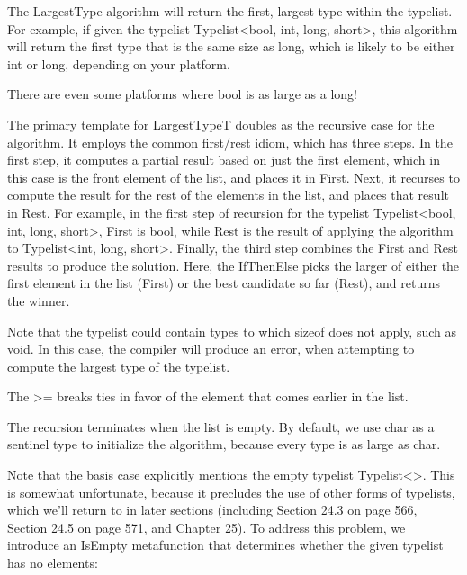 The LargestType algorithm will return the first, largest type within the typelist. For example, if given the typelist Typelist<bool, int, long, short>, this algorithm will return the first type that is the same size as long, which is likely to be either int or long, depending on your platform.

\begin{tcolorbox}[colback=webgreen!5!white,colframe=webgreen!75!black]
\hspace*{0.75cm}There are even some platforms where bool is as large as a long!
\end{tcolorbox}

The primary template for LargestTypeT doubles as the recursive case for the algorithm. It employs the common first/rest idiom, which has three steps. In the first step, it computes a partial result based on just the first element, which in this case is the front element of the list, and places it in First. Next, it recurses to compute the result for the rest of the elements in the list, and places that result in Rest. For example, in the first step of recursion for the typelist Typelist<bool, int, long, short>, First is bool, while Rest is the result of applying the algorithm to Typelist<int, long, short>. Finally, the third step combines the First and Rest results to produce the solution. Here, the IfThenElse picks the larger of either the first element in the list (First) or the best candidate so far (Rest), and returns the winner.

\begin{tcolorbox}[colback=webgreen!5!white,colframe=webgreen!75!black]
\hspace*{0.75cm}Note that the typelist could contain types to which sizeof does not apply, such as void. In this case, the compiler will produce an error, when attempting to compute the largest type of the typelist.
\end{tcolorbox}

The >= breaks ties in favor of the element that comes earlier in the list.

The recursion terminates when the list is empty. By default, we use char as a sentinel type to initialize the algorithm, because every type is as large as char.

Note that the basis case explicitly mentions the empty typelist Typelist<>. This is somewhat unfortunate, because it precludes the use of other forms of typelists, which we’ll return to in later sections (including Section 24.3 on page 566, Section 24.5 on page 571, and Chapter 25). To address this problem, we introduce an IsEmpty metafunction that determines whether the given typelist has no elements:

